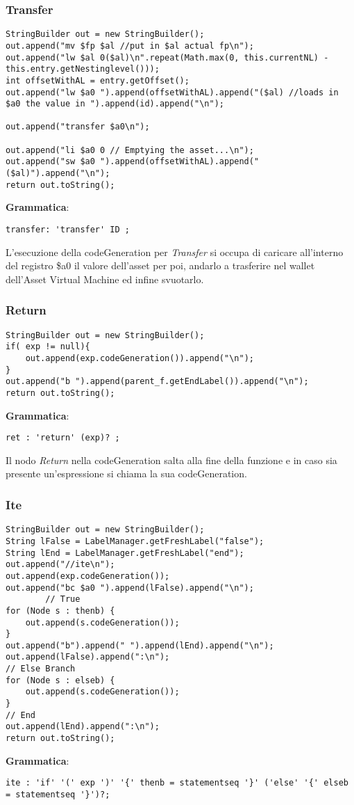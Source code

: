 \documentclass[12pt,twoside,openright,a4paper]{report}
\begin{document}
\subsubsection{Transfer}
\begin{lstlisting}
StringBuilder out = new StringBuilder();
out.append("mv $fp $al //put in $al actual fp\n");
out.append("lw $al 0($al)\n".repeat(Math.max(0, this.currentNL) - this.entry.getNestinglevel()));
int offsetWithAL = entry.getOffset();
out.append("lw $a0 ").append(offsetWithAL).append("($al) //loads in $a0 the value in ").append(id).append("\n");

out.append("transfer $a0\n");

out.append("li $a0 0 // Emptying the asset...\n");
out.append("sw $a0 ").append(offsetWithAL).append("($al)").append("\n");
return out.toString();
\end{lstlisting}
\textbf{Grammatica}:
\begin{lstlisting}
transfer: 'transfer' ID ;
\end{lstlisting}
L'esecuzione della codeGeneration per \textit{Transfer} si occupa di caricare all'interno del registro \$a0 il valore dell'asset per poi, andarlo a trasferire nel wallet dell'Asset Virtual Machine ed infine svuotarlo.
\newpage
\subsubsection{Return}
\begin{lstlisting}
StringBuilder out = new StringBuilder();
if( exp != null){
    out.append(exp.codeGeneration()).append("\n");
}
out.append("b ").append(parent_f.getEndLabel()).append("\n");
return out.toString();
\end{lstlisting}
\textbf{Grammatica}:
\begin{lstlisting}
ret	: 'return' (exp)? ;
\end{lstlisting}
Il nodo \textit{Return} nella codeGeneration salta alla fine della funzione e in caso sia presente un'espressione si chiama la sua codeGeneration.

\subsubsection{Ite}
\begin{lstlisting}
StringBuilder out = new StringBuilder();
String lFalse = LabelManager.getFreshLabel("false");
String lEnd = LabelManager.getFreshLabel("end");
out.append("//ite\n");
out.append(exp.codeGeneration());
out.append("bc $a0 ").append(lFalse).append("\n");
        // True
for (Node s : thenb) {
    out.append(s.codeGeneration());
}
out.append("b").append(" ").append(lEnd).append("\n");
out.append(lFalse).append(":\n");
// Else Branch
for (Node s : elseb) {
    out.append(s.codeGeneration());
}
// End
out.append(lEnd).append(":\n");
return out.toString();
\end{lstlisting}
\textbf{Grammatica}:
\begin{lstlisting}
ite : 'if' '(' exp ')' '{' thenb = statementseq '}' ('else' '{' elseb = statementseq '}')?;
\end{lstlisting}
\end{document}
